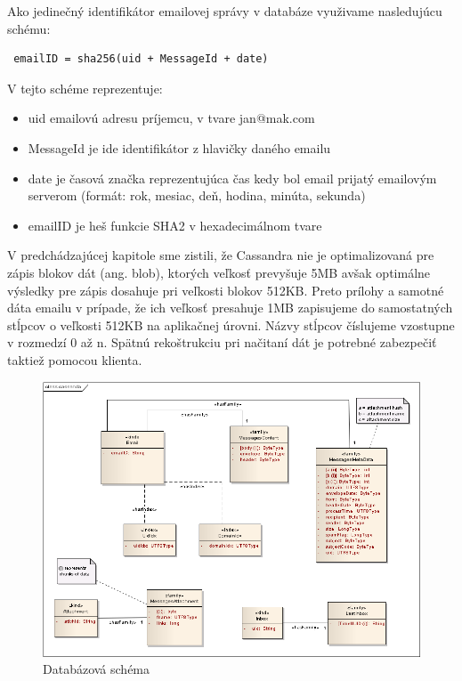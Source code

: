 \documentclass[11pt,twoside,a4paper]{book}
\begin{document}
Ako jedinečný identifikátor emailovej správy v databáze využivame nasledujúcu schému:
\begin{verbatim}
 emailID = sha256(uid + MessageId + date)
\end{verbatim}

V tejto schéme reprezentuje:
\begin{itemize}
 \item uid emailovú adresu príjemcu, v tvare jan@mak.com
 \item MessageId je ide identifikátor z hlavičky daného emailu
 \item date je časová značka reprezentujúca čas kedy bol email prijatý emailovým serverom (formát: rok, mesiac, deň, hodina, minúta, sekunda)
 \item emailID je heš funkcie SHA2 v hexadecimálnom tvare
\end{itemize}


V predchádzajúcej kapitole sme zistili, že Cassandra nie je optimalizovaná pre zápis blokov dát (ang. blob), ktorých veľkosť prevyšuje 5MB avšak optimálne výsledky pre zápis dosahuje pri veľkosti blokov 512KB. Preto prílohy a samotné dáta emailu v prípade, že ich veľkosť presahuje 1MB zapisujeme do samostatných stĺpcov o veľkosti 512KB na aplikačnej úrovni. Názvy stĺpcov číslujeme vzostupne v rozmedzí 0 až n. Spätnú rekoštrukciu pri načitaní dát je potrebné zabezpečiť taktiež pomocou klienta.

\begin{figure}[h]
 \centering
 \includegraphics[width=17cm]{./figures/cassandra.png}
 \caption{Databázová schéma}
 \label{fig:Cschema}
\end{figure}
\end{document}
